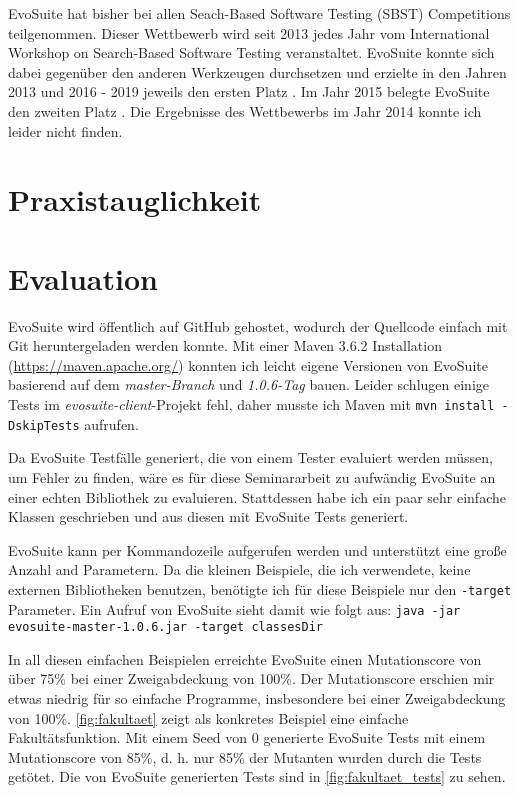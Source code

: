 \documentclass[a4paper,11pt]{article}
\begin{document}
EvoSuite hat bisher bei allen Seach-Based Software Testing (SBST) Competitions teilgenommen.
Dieser Wettbewerb wird seit 2013 jedes Jahr vom International Workshop on Search-Based Software Testing veranstaltet.
EvoSuite konnte sich dabei gegenüber den anderen Werkzeugen durchsetzen und erzielte in den Jahren 2013 und 2016 - 2019 jeweils den ersten Platz \cite{6571663, 7810701, 7967958, 8452806, 8812209}.
Im Jahr 2015 belegte EvoSuite den zweiten Platz \cite{7173585}.
Die Ergebnisse des Wettbewerbs im Jahr 2014 konnte ich leider nicht finden.

\section{Praxistauglichkeit}

\section{Evaluation}

EvoSuite wird öffentlich auf GitHub gehostet, wodurch der Quellcode einfach mit Git heruntergeladen werden konnte.
Mit einer Maven 3.6.2 Installation (\url{https://maven.apache.org/}) konnten ich leicht eigene Versionen von EvoSuite basierend auf dem \textit{master-Branch} und \textit{1.0.6-Tag} bauen.
Leider schlugen einige Tests im \textit{evosuite-client}-Projekt fehl, daher musste ich Maven mit \texttt{mvn install -DskipTests} aufrufen.

Da EvoSuite Testfälle generiert, die von einem Tester evaluiert werden müssen, um Fehler zu finden, wäre es für diese Seminararbeit zu aufwändig EvoSuite an einer echten Bibliothek zu evaluieren.
Stattdessen habe ich ein paar sehr einfache Klassen geschrieben und aus diesen mit EvoSuite Tests generiert.

EvoSuite kann per Kommandozeile aufgerufen werden und unterstützt eine große Anzahl and Parametern.
Da die kleinen Beispiele, die ich verwendete, keine externen Bibliotheken benutzen, benötigte ich für diese Beispiele nur den \texttt{-target} Parameter.
Ein Aufruf von EvoSuite sieht damit wie folgt aus: \texttt{java -jar evosuite-master-1.0.6.jar -target classesDir}

In all diesen einfachen Beispielen erreichte EvoSuite einen Mutationscore von über 75\% bei einer Zweigabdeckung von 100\%.
Der Mutationscore erschien mir etwas niedrig für so einfache Programme, insbesondere bei einer Zweigabdeckung von 100\%.
\cref{fig:fakultaet} zeigt als konkretes Beispiel eine einfache Fakultätsfunktion.
Mit einem Seed von 0 generierte EvoSuite Tests mit einem Mutationscore von 85\%, d. h. nur 85\% der Mutanten wurden durch die Tests getötet.
Die von EvoSuite generierten Tests sind in \cref{fig:fakultaet_tests} zu sehen. 
\end{document}
